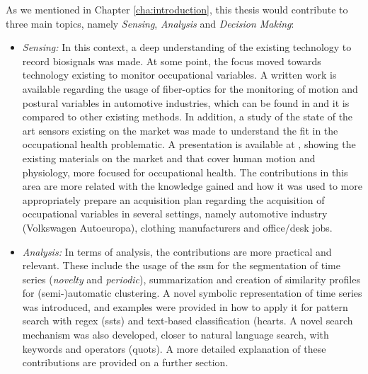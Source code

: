 As we mentioned in Chapter \ref{cha:introduction}, this thesis would contribute to three main topics, namely \textit{Sensing}, \textit{Analysis} and \textit{Decision Making}:
\begin{itemize}
\item \textit{Sensing:} In this context, a deep understanding of the existing technology to record biosignals was made. At some point, the focus moved towards technology existing to monitor occupational variables. A written work is available regarding the usage of fiber-optics for the monitoring of motion and postural variables in automotive industries, which can be found in \cite{fiber_optics} and it is compared to other existing methods. In addition, a study of the state of the art sensors existing on the market was made to understand the fit in the occupational health problematic. A presentation is available at \cite{sensors_slides}, showing the existing materials on the market and that cover human motion and physiology, more focused for occupational health. The contributions in this area are more related with the knowledge gained and how it was used to more appropriately prepare an acquisition plan regarding the acquisition of occupational variables in several settings, namely automotive industry (Volkswagen Autoeuropa), clothing manufacturers and office/desk jobs.\\

\item \textit{Analysis:} In terms of analysis, the contributions are more practical and relevant. These include the usage of the \gls{ssm} for the segmentation of time series (\textit{novelty} and \textit{periodic}), summarization and creation of similarity profiles for (semi-)automatic clustering. A novel symbolic representation of time series was introduced, and examples were provided in how to apply it for pattern search with \gls{regex} (\gls{ssts}) and text-based classification (\gls{hearts}. A novel search mechanism was also developed, closer to natural language search, with keywords and operators (\gls{quots}). A more detailed explanation of these contributions are provided on a further section.\\


\end{itemize}
